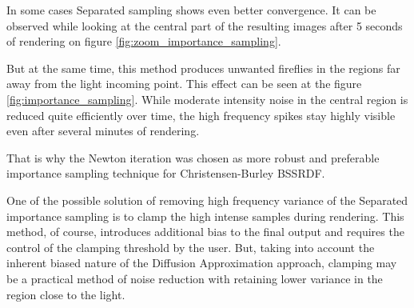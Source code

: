 In some cases Separated sampling shows even better convergence. It can be observed while looking at
the central part of the resulting images after 5 seconds of rendering on figure
\ref{fig:zoom_importance_sampling}. 

But at the same time, this method produces unwanted fireflies in the regions far away from the light
incoming point. This effect can be seen at the figure \ref{fig:importance_sampling}. While
moderate intensity noise in the central region is reduced quite efficiently over time, the high
frequency spikes stay highly visible even after several minutes of rendering.

That is why the Newton iteration was chosen as more robust and preferable importance sampling
technique for Christensen-Burley BSSRDF.

One of the possible solution of removing high frequency variance of the Separated importance
sampling is to clamp the high intense samples during rendering. This method, of course, introduces
additional bias to the final output and requires the control of the clamping threshold by the user.
But, taking into account the inherent biased nature of the Diffusion Approximation approach,
clamping may be a practical method of noise reduction with retaining lower variance in the region
close to the light.
